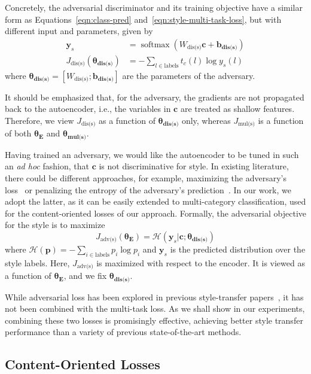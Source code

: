 \documentclass[letterpaper]{article} %
\newcommand{\loss}[1]{J_{\text{#1}}}
\newcommand{\nnweight}[1]{\bm{\theta_{\text{#1}}}}
\newcommand{\weight}[1]{W_{\text{#1}}}
\newcommand{\bias}[1]{\bm{b_{\text{#1}}}}
\begin{document}
Concretely, the adversarial discriminator and its training objective have a similar form as Equations~\ref{eqn:class-pred} and~\ref{eqn:style-multi-task-loss}, but with different input and parameters, given by
\begin{align}
	\label{eqn:adv-disc-loss}
	\bm y_s                          & = \operatorname{softmax}(\weight{dis(s)} \bm c + \bias{dis(s)}) \\
	\loss{dis(s)}(\nnweight{dis(s)}) & = - \sum\nolimits_{l\in\text{labels}} t_c(l)\log y_s(l)
\end{align}
where $\nnweight{dis(s)}=[\weight{dis(s)}; \bias{dis(s)}]$ are the parameters of the adversary.

It should be emphasized that, for the adversary, the gradients are not propagated back to the autoencoder, i.e., the variables in $\bm c$ are treated as shallow features. Therefore, we view $\loss{dis(s)}$ as a function of $\nnweight{dis(s)}$ only, whereas $\loss{mul(s)}$ is a function of both $\nnweight{E}$ and $\nnweight{mul(s)}$.

Having trained an adversary, we would like the autoencoder to be tuned in such an \textit{ad hoc} fashion, that $\bm c$ is not discriminative for style.
In existing literature, there could be different approaches, for example, maximizing the adversary's loss~\cite{shen2017style,zhao2018adversarially} or penalizing the entropy of the adversary's prediction~\cite{fu2018style}.
In our work, we adopt the latter, as it can be easily extended to multi-category classification, used for the content-oriented losses of our approach. Formally, the adversarial objective for the style is to maximize
\begin{equation} \label{eqn:advs}
	\loss{adv(s)}(\nnweight{E})=\mathcal{H}(\bm y_s|\bm c; \nnweight{dis(s)})
\end{equation}
where $\mathcal{H}(\bm p)=-\sum_{i\in\text{labels}}p_i\log p_i$ and $\bm y_s$ is the predicted distribution over the style labels. Here, $\loss{adv(s)}$ is maximized with respect to the encoder. It is viewed as a function of $\nnweight{E}$, and we fix $\nnweight{dis(s)}$.

While adversarial loss has been explored in previous style-transfer papers~\cite{shen2017style,fu2018style}, it has not been combined with the multi-task loss. As we shall show in our experiments, combining these two losses is promisingly effective, achieving better style transfer performance than a variety of previous state-of-the-art methods.

\subsection{Content-Oriented Losses}
\end{document}
